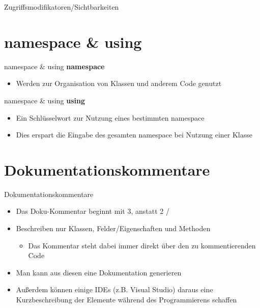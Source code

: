 \begin{frame}{Zugriffsmodifikatoren/Sichtbarkeiten}
	
\end{frame}

\section{namespace \& using}
\begin{frame}{namespace \& using}
	\textbf{namespace}\\
	\begin{itemize}
		\item Werden zur Organisation von Klassen und anderem Code genutzt
	\end{itemize}	
	
\end{frame}

\begin{frame}{namespace \& using}
	\textbf{using}\\
	\begin{itemize}
		\item Ein Schlüsselwort zur Nutzung eines bestimmten namespace
		\item Dies erspart die Eingabe des gesamten namespace bei Nutzung einer Klasse
	\end{itemize}
	
\end{frame}

\section{Dokumentationskommentare}
\begin{frame}{Dokumentationskommentare}
	\begin{itemize}
		\item Das Doku-Kommentar beginnt mit 3, anstatt 2 \alert{/}
		\item Beschreiben nur Klassen, Felder/Eigenschaften und Methoden
		\begin{itemize}
			\item Das Kommentar steht dabei immer direkt über den zu kommentierenden Code
		\end{itemize}
		\item Man kann aus diesen eine Dokumentation generieren
		\item Außerdem können einige IDEs (z.B. Visual Studio) daraus eine Kurzbeschreibung der Elemente während des Programmierens schaffen		
	\end{itemize}
\end{frame}

